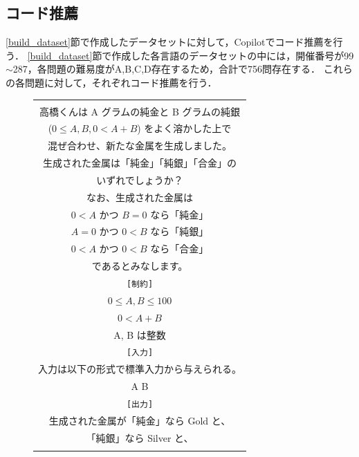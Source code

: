   \subsection{コード推薦\label{recommend_program}}
    \ref{build_dataset}節で作成したデータセットに対して，Copilotでコード推薦を行う．
    \ref{build_dataset}節で作成した各言語のデータセットの中には，開催番号が99${\sim}$287，各問題の難易度がA,B,C,D存在するため，合計で756問存在する．
    これらの各問題に対して，それぞれコード推薦を行う．
    
    \begin{figure}[t]
      \begin{tabular}{c}
        \begin{tabularx}{23zw}{l}
          \hline
          \verb|[問題文]| \\
          \textrm{  高橋くんは A グラムの純金と B グラムの純銀} \\
          \textrm{  ($0 \leq A, B, 0 < A+B$) をよく溶かした上で} \\
          \textrm{  混ぜ合わせ、新たな金属を生成しました。} \\
          \textrm{  生成された金属は「純金」「純銀」「合金」の} \\
          \textrm{  いずれでしょうか？} \\
          \textrm{  なお、生成された金属は} \\
          \textrm{  $0 < A$ かつ $B = 0$ なら「純金」} \\
          \textrm{  $A = 0$ かつ $0 < B$ なら「純銀」} \\
          \textrm{  $0 < A$ かつ $0 < B$ なら「合金」} \\
          \textrm{  であるとみなします。} \\
          \verb|[制約]| \\
          \textrm{  $0 \leq A,B \leq 100$} \\
          \textrm{  $0 < A+B$} \\
          \textrm{  A, B は整数} \\
          \verb|[入力]| \\
          \textrm{  入力は以下の形式で標準入力から与えられる。} \\
          \textrm{  A B} \\
          \verb|[出力]| \\
          \textrm{  生成された金属が「純金」なら Gold と、} \\
          \textrm{  「純銀」なら Silver と、} \\

\end{tabularx}
\end{tabular}
\end{figure}
